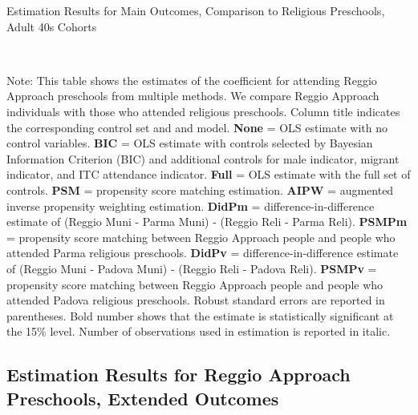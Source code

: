 \begin{table}[H] \caption{Estimation Results for Main Outcomes, Comparison to Religious Preschools, Adult 40s Cohorts} \label{ols-M-adult40-reg-reli}
\scalebox{0.75}{}
\vspace{1ex} \\
\footnotesize\raggedright{Note: This table shows the estimates of the coefficient for attending Reggio Approach preschools from multiple methods. We compare Reggio Approach individuals with those who attended religious preschools. Column title indicates the corresponding control set and and model. \textbf{None} = OLS estimate with no control variables. \textbf{BIC} = OLS estimate with controls selected by Bayesian Information Criterion (BIC) and additional controls for male indicator, migrant indicator, and ITC attendance indicator. \textbf{Full} = OLS estimate with the full set of controls. \textbf{PSM} =  propensity score matching estimation. \textbf{AIPW} = augmented inverse propensity weighting estimation. \textbf{DidPm} = difference-in-difference estimate of (Reggio Muni - Parma Muni) - (Reggio Reli - Parma Reli). \textbf{PSMPm} = propensity score matching between Reggio Approach people and people who attended Parma religious preschools. \textbf{DidPv} = difference-in-difference estimate of (Reggio Muni - Padova Muni) - (Reggio Reli - Padova Reli). \textbf{PSMPv} = propensity score matching between Reggio Approach people and people who attended Padova religious preschools. Robust standard errors are reported in parentheses. Bold number shows that the estimate is statistically significant at the 15\% level. Number of observations used in estimation is reported in italic.}
\end{table}





\subsection{Estimation Results for Reggio Approach Preschools, Extended Outcomes}  \label{appsec:extended-outcome}

